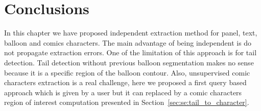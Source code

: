 
\section{Conclusions}
\label{sec:in:conclusion}

In this chapter we have proposed independent extraction method for panel, text, balloon and comics characters.
The main advantage of being independent is do not propagate extraction errors.
One of the limitation of this approach is for tail detection.
Tail detection without previous balloon segmentation makes no sense because it is a specific region of the balloon contour.
Also, unsupervised comic characters extraction is a real challenge, here we proposed a first query based approach which is given by a user but it can replaced by a comic characters region of interest computation presented in Section~\ref{sec:se:tail_to_character}.



